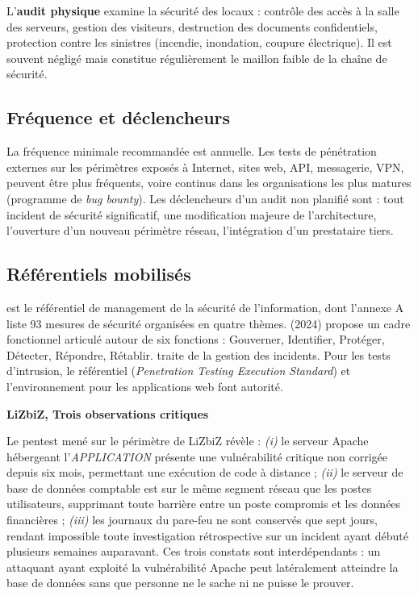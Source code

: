 L'\textbf{audit physique} examine la sécurité des locaux : contrôle des accès à la salle des serveurs, gestion des visiteurs, destruction des documents confidentiels, protection contre les sinistres (incendie, inondation, coupure électrique). Il est souvent négligé mais constitue régulièrement le maillon faible de la chaîne de sécurité.

\subsection{Fréquence et déclencheurs}

La fréquence minimale recommandée est annuelle. Les tests de pénétration externes sur les périmètres exposés à Internet, sites web, API, messagerie, VPN, peuvent être plus fréquents, voire continus dans les organisations les plus matures (programme de \textit{bug bounty}). Les déclencheurs d'un audit non planifié sont : tout incident de sécurité significatif, une modification majeure de l'architecture, l'ouverture d'un nouveau périmètre réseau, l'intégration d'un prestataire tiers.

\subsection{Référentiels mobilisés}

 est le référentiel de management de la sécurité de l'information, dont l'annexe A liste 93 mesures de sécurité organisées en quatre thèmes.  (2024) propose un cadre fonctionnel articulé autour de six fonctions : Gouverner, Identifier, Protéger, Détecter, Répondre, Rétablir.  traite de la gestion des incidents. Pour les tests d'intrusion, le référentiel  (\textit{Penetration Testing Execution Standard}) et l'environnement  pour les applications web font autorité.

\begin{boxlizbiz}
\textbf{LiZbiZ, Trois observations critiques}

Le pentest mené sur le périmètre de LiZbiZ révèle : \textit{(i)} le serveur Apache hébergeant l'\textit{APPLICATION} présente une vulnérabilité critique non corrigée depuis six mois, permettant une exécution de code à distance ; \textit{(ii)} le serveur de base de données comptable est sur le même segment réseau que les postes utilisateurs, supprimant toute barrière entre un poste compromis et les données financières ; \textit{(iii)} les journaux du pare-feu ne sont conservés que sept jours, rendant impossible toute investigation rétrospective sur un incident ayant débuté plusieurs semaines auparavant. Ces trois constats sont interdépendants : un attaquant ayant exploité la vulnérabilité Apache peut latéralement atteindre la base de données sans que personne ne le sache ni ne puisse le prouver.
\end{boxlizbiz}


